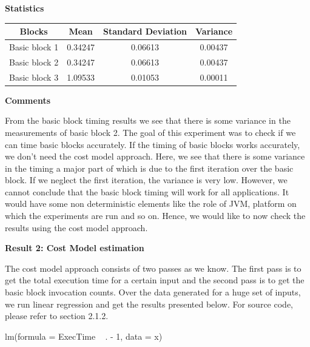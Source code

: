 \documentclass[11pt]{article}
\begin{document}
\textbf{Statistics}\\

\begin{center}
\begin{tabular}{|c|c|c|c|}
\hline
Blocks&Mean&Standard Deviation&Variance\\
\hline
Basic block 1&0.34247&0.06613&0.00437\\
Basic block 2&0.34247&0.06613&0.00437\\
Basic block 3&1.09533&0.01053&0.00011\\
\hline
\end{tabular}
\end{center}

\textbf{Comments}

From the basic block timing results we see that there is some variance in the measurements of basic block 2. The goal of this experiment was to check if we can time basic blocks accurately. If the timing of basic blocks works accurately, we don't need the cost model approach. Here, we see that there is some variance in the timing a major part of which is due to the first iteration over the basic block. If we neglect the first iteration, the variance is very low. However, we cannot conclude that the basic block timing will work for all applications. It would have some non deterministic elements like the role of JVM, platform on which the experiments are run and so on. Hence, we would like to now check the results using the cost model approach.

\textbf{Result 2: Cost Model estimation}

The cost model approach consists of two passes as we know. The first pass is to get the total execution time for a certain input and the second pass is to get the basic block invocation counts. Over the data generated for a huge set of inputs, we run linear regression and get the results presented below. For source code, please refer to section 2.1.2.

lm(formula = ExecTime ~ . - 1, data = x)
\end{document}
